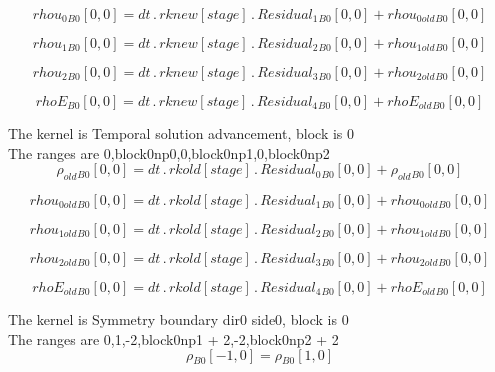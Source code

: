 \documentclass{article}
\begin{document}
\begin{dmath}{rhou_{0}{_{B0}}}[{0,0}] = dt \,.\, {rknew}[{stage}] \,.\, {Residual_{1}{_{B0}}}[{0,0}] + {rhou_{0 old}{_{B0}}}[{0,0}]\end{dmath}

\begin{dmath}{rhou_{1}{_{B0}}}[{0,0}] = dt \,.\, {rknew}[{stage}] \,.\, {Residual_{2}{_{B0}}}[{0,0}] + {rhou_{1 old}{_{B0}}}[{0,0}]\end{dmath}

\begin{dmath}{rhou_{2}{_{B0}}}[{0,0}] = dt \,.\, {rknew}[{stage}] \,.\, {Residual_{3}{_{B0}}}[{0,0}] + {rhou_{2 old}{_{B0}}}[{0,0}]\end{dmath}

\begin{dmath}{rhoE{_{B0}}}[{0,0}] = dt \,.\, {rknew}[{stage}] \,.\, {Residual_{4}{_{B0}}}[{0,0}] + {rhoE_{old}{_{B0}}}[{0,0}]\end{dmath}

\noindent The kernel is Temporal solution advancement, block is 0\\\noindent The ranges are 0,block0np0,0,block0np1,0,block0np2\\\begin{dmath}{\rho_{old}{_{B0}}}[{0,0}] = dt \,.\, {rkold}[{stage}] \,.\, {Residual_{0}{_{B0}}}[{0,0}] + {\rho_{old}{_{B0}}}[{0,0}]\end{dmath}

\begin{dmath}{rhou_{0 old}{_{B0}}}[{0,0}] = dt \,.\, {rkold}[{stage}] \,.\, {Residual_{1}{_{B0}}}[{0,0}] + {rhou_{0 old}{_{B0}}}[{0,0}]\end{dmath}

\begin{dmath}{rhou_{1 old}{_{B0}}}[{0,0}] = dt \,.\, {rkold}[{stage}] \,.\, {Residual_{2}{_{B0}}}[{0,0}] + {rhou_{1 old}{_{B0}}}[{0,0}]\end{dmath}

\begin{dmath}{rhou_{2 old}{_{B0}}}[{0,0}] = dt \,.\, {rkold}[{stage}] \,.\, {Residual_{3}{_{B0}}}[{0,0}] + {rhou_{2 old}{_{B0}}}[{0,0}]\end{dmath}

\begin{dmath}{rhoE_{old}{_{B0}}}[{0,0}] = dt \,.\, {rkold}[{stage}] \,.\, {Residual_{4}{_{B0}}}[{0,0}] + {rhoE_{old}{_{B0}}}[{0,0}]\end{dmath}

\noindent The kernel is Symmetry boundary dir0 side0, block is 0\\\noindent The ranges are 0,1,-2,block0np1 + 2,-2,block0np2 + 2\\\begin{dmath}{\rho{_{B0}}}[{-1,0}] = {\rho{_{B0}}}[{1,0}]\end{dmath}
\end{document}
